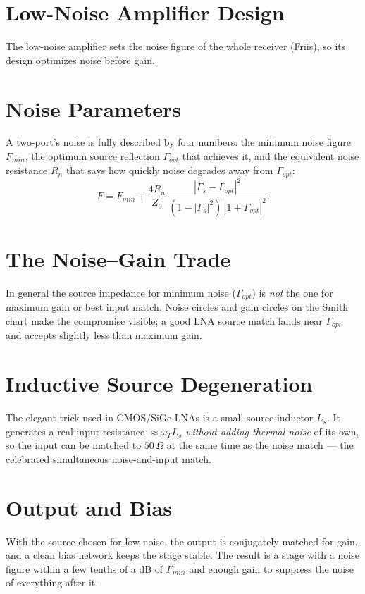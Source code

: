 \section{Low-Noise Amplifier Design}\label{sec:tb_lna}



The low-noise amplifier sets the noise figure of the whole receiver (Friis), so
its design optimizes noise before gain.

\section{Noise Parameters}
A two-port's noise is fully described by four numbers: the minimum noise figure
$F_{min}$, the optimum source reflection $\Gamma_{opt}$ that achieves it, and the
equivalent noise resistance $R_n$ that says how quickly noise degrades away from
$\Gamma_{opt}$:
\[ F = F_{min} + \frac{4 R_n}{Z_0}\,\frac{|\Gamma_s - \Gamma_{opt}|^2}
       {(1-|\Gamma_s|^2)\,|1+\Gamma_{opt}|^2}. \]

\section{The Noise--Gain Trade}
In general the source impedance for minimum noise ($\Gamma_{opt}$) is \emph{not}
the one for maximum gain or best input match. Noise circles and gain circles on
the Smith chart make the compromise visible; a good LNA source match lands near
$\Gamma_{opt}$ and accepts slightly less than maximum gain.

\section{Inductive Source Degeneration}
The elegant trick used in CMOS/SiGe LNAs is a small source inductor $L_s$. It
generates a real input resistance $\approx \omega_T L_s$ \emph{without adding
thermal noise} of its own, so the input can be matched to $50\,\Omega$ at the same
time as the noise match --- the celebrated simultaneous noise-and-input match.

\section{Output and Bias}
With the source chosen for low noise, the output is conjugately matched for gain,
and a clean bias network keeps the stage stable. The result is a stage with a
noise figure within a few tenths of a dB of $F_{min}$ and enough gain to suppress
the noise of everything after it.



